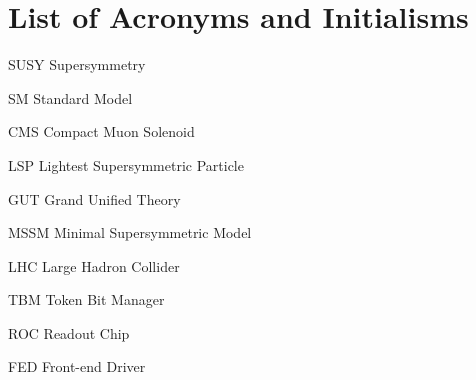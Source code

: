 \chapter{List of Acronyms and Initialisms}

\begin{abbrv}
\item[SUSY]                 Supersymmetry
\item[SM]                    Standard Model
\item[CMS]				    Compact Muon Solenoid
\item[LSP]					 Lightest Supersymmetric Particle
\item[GUT]					Grand Unified Theory
\item[MSSM]				   Minimal Supersymmetric Model
\item[LHC]					Large Hadron Collider
\item[TBM]					Token Bit Manager
\item[ROC]					Readout Chip
\item[FED]					Front-end Driver

\end{abbrv}
